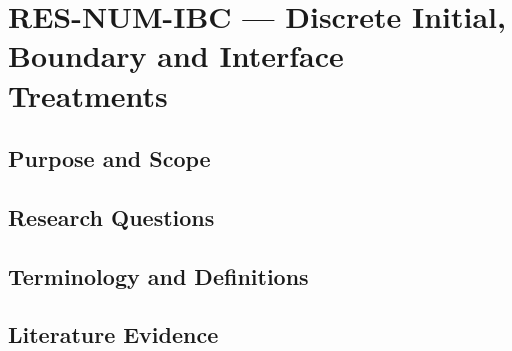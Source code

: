 
\section{RES-NUM-IBC --- Discrete Initial, Boundary and Interface Treatments}
\label{sec:res-num-ibc}

\subsection{Purpose and Scope}
\label{sec:res-num-ibc-purpose}


\subsection{Research Questions}
\label{sec:res-num-ibc-research-questions}


\subsection{Terminology and Definitions}
\label{sec:res-num-ibc-definitions}


\subsection{Literature Evidence}
\label{sec:res-num-ibc-literature-evidence}

%

